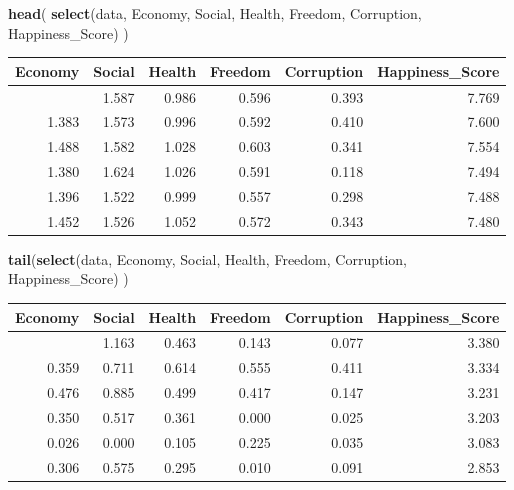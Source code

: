 \documentclass[
  11pt,
]{article}
\newenvironment{Shaded}{\begin{snugshade}}{\end{snugshade}}
\newcommand{\FunctionTok}[1]{\textcolor[rgb]{0.13,0.29,0.53}{\textbf{#1}}}
\newcommand{\NormalTok}[1]{#1}
\begin{document}
\begin{Shaded}
\begin{Highlighting}[]
\FunctionTok{head}\NormalTok{(}
    \FunctionTok{select}\NormalTok{(data, Economy, Social, Health, Freedom, Corruption,}
\NormalTok{           Happiness\_Score)}
\NormalTok{  )}
\end{Highlighting}
\end{Shaded}

\begin{longtable}[]{@{}rrrrrr@{}}
\toprule\noalign{}
Economy & Social & Health & Freedom & Corruption & Happiness\_Score \\
\midrule\noalign{}
\endhead
\bottomrule\noalign{}
\endlastfoot
1.340 & 1.587 & 0.986 & 0.596 & 0.393 & 7.769 \\
1.383 & 1.573 & 0.996 & 0.592 & 0.410 & 7.600 \\
1.488 & 1.582 & 1.028 & 0.603 & 0.341 & 7.554 \\
1.380 & 1.624 & 1.026 & 0.591 & 0.118 & 7.494 \\
1.396 & 1.522 & 0.999 & 0.557 & 0.298 & 7.488 \\
1.452 & 1.526 & 1.052 & 0.572 & 0.343 & 7.480 \\
\end{longtable}

\begin{Shaded}
\begin{Highlighting}[]
\FunctionTok{tail}\NormalTok{(}\FunctionTok{select}\NormalTok{(data, Economy, Social, Health, Freedom, Corruption,}
\NormalTok{            Happiness\_Score)}
\NormalTok{  )}
\end{Highlighting}
\end{Shaded}

\begin{longtable}[]{@{}rrrrrr@{}}
\toprule\noalign{}
Economy & Social & Health & Freedom & Corruption & Happiness\_Score \\
\midrule\noalign{}
\endhead
\bottomrule\noalign{}
\endlastfoot
0.287 & 1.163 & 0.463 & 0.143 & 0.077 & 3.380 \\
0.359 & 0.711 & 0.614 & 0.555 & 0.411 & 3.334 \\
0.476 & 0.885 & 0.499 & 0.417 & 0.147 & 3.231 \\
0.350 & 0.517 & 0.361 & 0.000 & 0.025 & 3.203 \\
0.026 & 0.000 & 0.105 & 0.225 & 0.035 & 3.083 \\
0.306 & 0.575 & 0.295 & 0.010 & 0.091 & 2.853 \\
\end{longtable}
\end{document}
